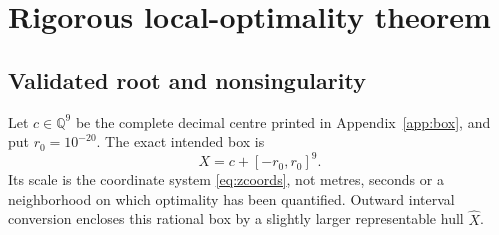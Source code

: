 \section{Rigorous local-optimality theorem}\label{sec:local}
\subsection{Validated root and nonsingularity}
Let $c\in\mathbb Q^9$ be the complete decimal centre printed in Appendix~\ref{app:box}, and put $r_0=10^{-20}$. The exact intended box is
\begin{equation}\label{eq:box}
 X=c+[-r_0,r_0]^9.
\end{equation}
Its scale is the coordinate system \eqref{eq:zcoords}, not metres, seconds or a neighborhood on which optimality has been quantified. Outward interval conversion encloses this rational box by a slightly larger representable hull $\widehat X$.

